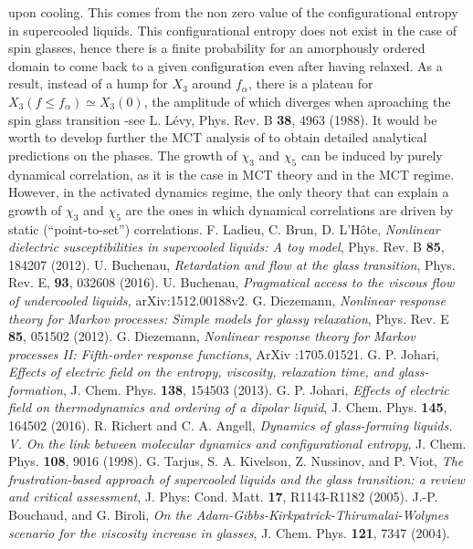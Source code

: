 \documentclass[single column,pre]{revtex4}
\begin{document}
\begin{thebibliography}{99}
 upon cooling.
 This comes from the non zero value of the configurational entropy in supercooled liquids. This configurational entropy does not exist in the case of spin glasses, hence there is a finite probability for an amorphously ordered domain to come 
back to a given configuration even after having relaxed. As a result, instead of a hump for $X_3$ around $f_{\alpha}$, there is a plateau for
 $X_3(f \le f_{\alpha}) \simeq X_3(0)$, the amplitude of which diverges when aproaching the spin glass transition -see L. L\'evy, Phys. Rev. B {\bf 38}, 4963 (1988).
 It would be worth to develop further the MCT analysis of \cite{Tar10} to obtain detailed analytical predictions on the phases.
 The growth of $\chi_3$ and $\chi_5$ can be induced by purely dynamical correlation, as it is the case in MCT theory and in the MCT regime. 
However, in the activated dynamics regime, the only theory that can explain a growth of $\chi_3$ and $\chi_5$ are the ones in which 
dynamical correlations are driven by static (``point-to-set'') correlations.
 F. Ladieu, C. Brun, D. L'H\^ote, \textit{Nonlinear dielectric susceptibilities in supercooled liquids: A toy model}, Phys. Rev. B {\bf 85}, 184207 (2012).
 U. Buchenau, \textit{Retardation and flow at the glass transition}, Phys. Rev. E, {\bf 93}, 032608 (2016).
 U. Buchenau, \textit{Pragmatical access to the viscous flow of undercooled liquids,} arXiv:1512.00188v2.
 G. Diezemann, \textit{Nonlinear response theory for Markov processes: Simple models for glassy relaxation}, Phys. Rev. E {\bf 85}, 051502 (2012).
 G. Diezemann, \textit{Nonlinear response theory for Markov processes II: Fifth-order response functions}, ArXiv :1705.01521.
 G. P. Johari, \textit{Effects of electric field on the entropy, viscosity, relaxation time, and glass-formation}, J. Chem. Phys. {\bf 138}, 154503 (2013).
 G. P. Johari,  \textit{Effects of electric field on thermodynamics and ordering of a dipolar liquid},
J. Chem. Phys. {\bf 145}, 164502 (2016).
 R. Richert and C. A. Angell,\textit{ Dynamics of glass-forming liquids. V. On the link between molecular dynamics and configurational entropy}, J. Chem. Phys. {\bf 108}, 9016 (1998).
 G. Tarjus, S. A. Kivelson, Z. Nussinov, and P. Viot, \textit{The frustration-based approach of supercooled liquids and the glass transition: a review and critical assessment}, J. Phys: Cond. Matt. {\bf 17}, R1143-R1182 (2005).
 J.-P. Bouchaud, and G. Biroli, \textit{On the Adam-Gibbs-Kirkpatrick-Thirumalai-Wolynes scenario for the viscosity increase in glasses}, J. Chem. Phys. {\bf 121}, 7347 (2004). 

\end{thebibliography}
\end{document}
